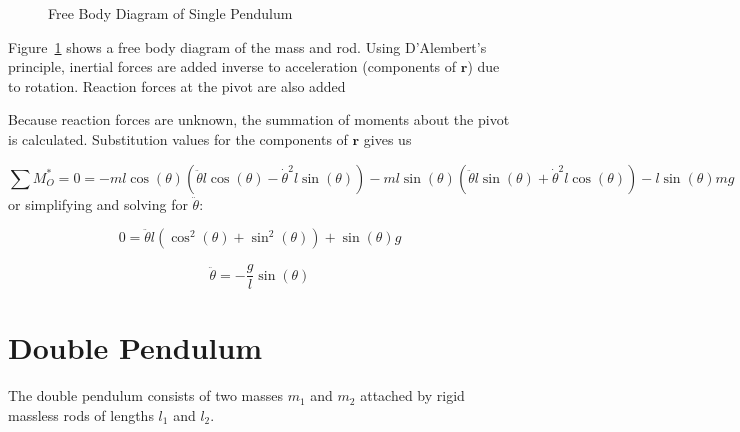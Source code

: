 \documentclass{article}
\begin{document}
\begin{figure}[h]
    \centering
    \caption{Free Body Diagram of Single Pendulum}
    \label{fig:Pendulum FBD}
\end{figure}

Figure~\ref{fig:Pendulum FBD} shows a free body diagram of the mass and rod. Using D'Alembert's principle, inertial forces are added inverse to acceleration (components of $\mathbf{r}$) due to rotation. Reaction forces at the pivot are also added

Because reaction forces are unknown, the summation of moments about the pivot is calculated. Substitution values for the components of $\mathbf{r}$ gives us

\[
    \sum M^*_O = 0 = - ml \cos(\theta) \left(  \ddot{\theta} l \cos(\theta) - \dot{\theta}^2 l \sin(\theta) \right) - ml \sin(\theta) \left( \ddot{\theta} l \sin(\theta) + \dot{\theta}^2 l \cos(\theta) \right) - l \sin(\theta) m g 
\]
or simplifying and solving for $\ddot{\theta}$:

\[
    0 = \ddot{\theta} l \left( \cos^2(\theta) + \sin^2(\theta)\right) + \sin(\theta)g
\]

\[
    \ddot{\theta} = -\frac{g}{l} \sin(\theta)
\]

\section{Double Pendulum}
The double pendulum consists of two masses $m_1$ and $m_2$ attached by rigid massless rods of lengths $l_1$ and $l_2$.
\end{document}
